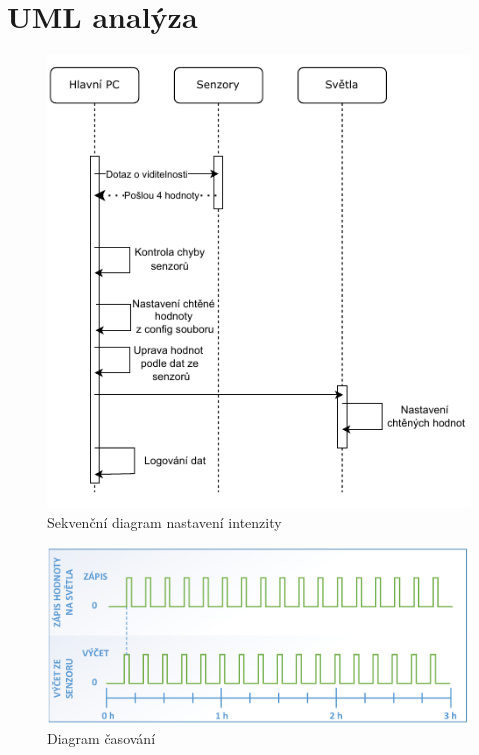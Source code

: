 \chapter{UML analýza}



\begin{figure}[H]
    \centering\includegraphics[width=.7\textwidth]{Figures/Sekvencni_diagram.pdf}   
    \caption{Sekvenční diagram nastavení intenzity}
    \label{Obr-Sekvencni_Diagram}
\end{figure}

\begin{figure}[H]
    \centering\includegraphics[width=.7\textwidth]{Figures/CasovaniDiagram.pdf}   
    \caption{Diagram časování}
    \label{Obr-Casovani_Diagram}
\end{figure}

